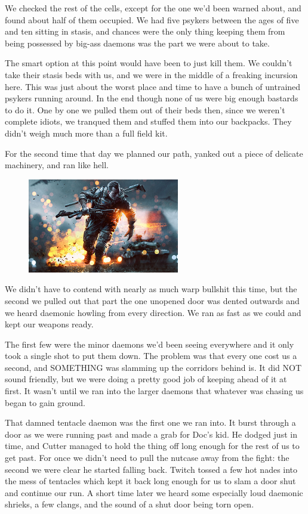We checked the rest of the cells, except for the one we’d been warned about, and found about half of them occupied. 
We had five psykers between the ages of five and ten sitting in stasis, and chances were the only thing keeping them from being possessed by big-ass daemons was the part we were about to take.

The smart option at this point would have been to just kill them. 
We couldn’t take their stasis beds with us, and we were in the middle of a freaking incursion here. 
This was just about the worst place and time to have a bunch of untrained psykers running around. 
In the end though none of us were big enough bastards to do it. 
One by one we pulled them out of their beds then, since we weren’t complete idiots, we tranqued them and stuffed them into our backpacks. 
They didn’t weigh much more than a full field kit.

For the second time that day we planned our path, yanked out a piece of delicate machinery, and ran like hell.

\begin{figure}
	\begin{center}
		\includegraphics[width=\figwidth]{pics/7/39.png}
	\end{center}
\end{figure}
We didn’t have to contend with nearly as much warp bullshit this time, but the second we pulled out that part the one unopened door was dented outwards and we heard daemonic howling from every direction. 
We ran as fast as we could and kept our weapons ready.

The first few were the minor daemons we’d been seeing everywhere and it only took a single shot to put them down. 
The problem was that every one cost us a second, and SOMETHING was slamming up the corridors behind is. 
It did NOT sound friendly, but we were doing a pretty good job of keeping ahead of it at first. 
It wasn’t until we ran into the larger daemons that whatever was chasing us began to gain ground.

That damned tentacle daemon was the first one we ran into. 
It burst through a door as we were running past and made a grab for Doc’s kid. 
He dodged just in time, and Cutter managed to hold the thing off long enough for the rest of us to get past. 
For once we didn’t need to pull the nutcase away from the fight: 
the second we were clear he started falling back. 
Twitch tossed a few hot nades into the mess of tentacles which kept it back long enough for us to slam a door shut and continue our run. 
A short time later we heard some especially loud daemonic shrieks, a few clangs, and the sound of a shut door being torn open.

